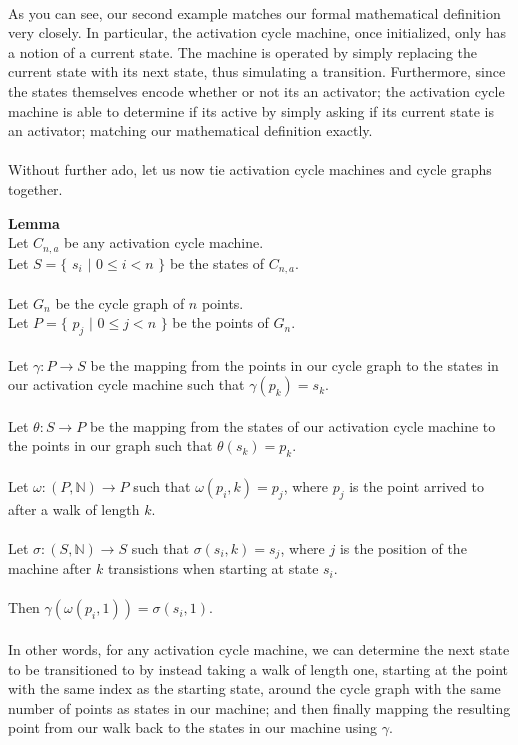 \documentclass[a4paper,12pt]{article}
\begin{document}
\noindent
\\
As you can see, our second example matches our formal mathematical definition very closely. In particular, the activation cycle machine, once initialized, only has a notion of a current state. The machine is operated by simply replacing the current state with its next state, thus simulating a transition. Furthermore, since the states themselves encode whether or not its an activator; the activation cycle machine is able to determine if its active by simply asking if its current state is an activator; matching our mathematical definition exactly.\\
\\
Without further ado, let us now tie activation cycle machines and cycle graphs together.\\
\begin{tcolorbox}
\textbf{Lemma}\\
Let $C_{n,a}$ be any activation cycle machine.\\
Let $S = \{$ $s_i$ $|$ $0 \leq i < n$ $\}$ be the states of $C_{n,a}$.\\
\\
Let $G_n$ be the cycle graph of $n$ points.\\
Let $P = \{$ $p_j$ $|$ $0 \leq j < n$ $\}$ be the points of $G_n$.\\
\\
Let $\gamma: P \rightarrow S$ be the mapping from the points in our cycle graph to the states in our activation cycle machine such that $\gamma(p_k) = s_k$.\\
\\
Let $\theta: S \rightarrow P$ be the mapping from the states of our activation cycle machine to the points in our graph such that $\theta(s_k) = p_k$.\\
\\
Let $\omega: (P, \mathbb{N}) \rightarrow P$ such that $\omega(p_i, k) = p_j$, where $p_j$ is the point arrived to after a walk of length $k$.\\
\\
Let $\sigma: (S, \mathbb{N}) \rightarrow S$ such that $\sigma(s_i, k) = s_j$, where $j$ is the position of the machine after $k$ transistions when starting at state $s_i$.\\  
\\
Then $\gamma(\omega(p_i, 1)) = \sigma(s_i, 1)$.\\
\\
In other words, for any activation cycle machine, we can determine the next state to be transitioned to by instead taking a walk of length one, starting at the point with the same index as the starting state, around the cycle graph with the same number of points as states in our machine; and then finally mapping the resulting point from our walk back to the states in our machine using $\gamma$.
\end{tcolorbox}
\end{document}
